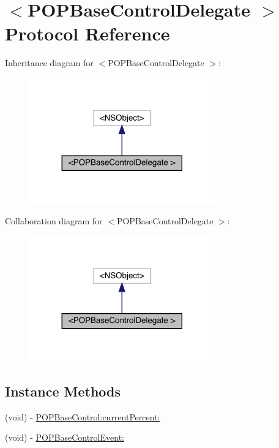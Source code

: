 \hypertarget{protocol_p_o_p_base_control_delegate_01-p}{}\section{$<$P\+O\+P\+Base\+Control\+Delegate $>$ Protocol Reference}
\label{protocol_p_o_p_base_control_delegate_01-p}


Inheritance diagram for $<$P\+O\+P\+Base\+Control\+Delegate $>$\+:\nopagebreak
\begin{figure}[H]
\begin{center}
\leavevmode
\includegraphics[width=227pt]{protocol_p_o_p_base_control_delegate_01-p__inherit__graph}
\end{center}
\end{figure}


Collaboration diagram for $<$P\+O\+P\+Base\+Control\+Delegate $>$\+:\nopagebreak
\begin{figure}[H]
\begin{center}
\leavevmode
\includegraphics[width=227pt]{protocol_p_o_p_base_control_delegate_01-p__coll__graph}
\end{center}
\end{figure}
\subsection*{Instance Methods}
\begin{DoxyCompactItemize}
\item 
(void) -\/ \mbox{\hyperlink{protocol_p_o_p_base_control_delegate_01-p_ae271901a7e0225fc15eaa9e581939787}{P\+O\+P\+Base\+Control\+:current\+Percent\+:}}
\item 
(void) -\/ \mbox{\hyperlink{protocol_p_o_p_base_control_delegate_01-p_aac58101ed963f321265217f9e32d1f79}{P\+O\+P\+Base\+Control\+Event\+:}}
\end{DoxyCompactItemize}


